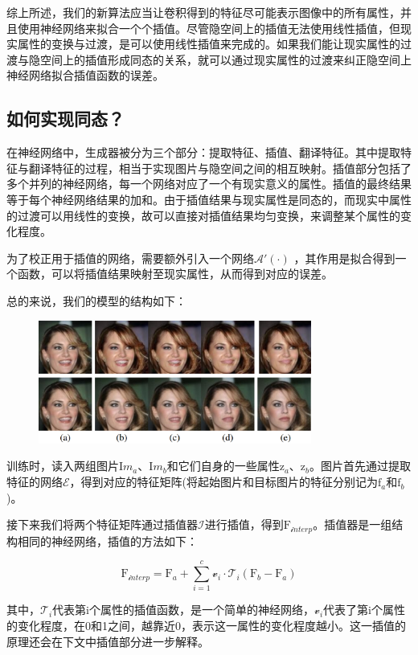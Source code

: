 \documentclass[UTF8,a4paper，12pt]{article}
\def\MC {\mathcal}
\theoremstyle{theorem}
\theoremstyle{definition}
\begin{document}
综上所述，我们的新算法应当让卷积得到的特征尽可能表示图像中的所有属性，并且使用神经网络来拟合一个个插值。尽管隐空间上的插值无法使用线性插值，但现实属性的变换与过渡，是可以使用线性插值来完成的。如果我们能让现实属性的过渡与隐空间上的插值形成同态的关系，就可以通过现实属性的过渡来纠正隐空间上神经网络拟合插值函数的误差。

\subsection{如何实现同态？}

在神经网络中，生成器被分为三个部分：提取特征、插值、翻译特征。其中提取特征与翻译特征的过程，相当于实现图片与隐空间之间的相互映射。插值部分包括了多个并列的神经网络，每一个网络对应了一个有现实意义的属性。插值的最终结果等于每个神经网络结果的加和。由于插值结果与现实属性是同态的，而现实中属性的过渡可以用线性的变换，故可以直接对插值结果均匀变换，来调整某个属性的变化程度。

为了校正用于插值的网络，需要额外引入一个网络$\MC A'(\cdot)$ ，其作用是拟合得到一个函数，可以将插值结果映射至现实属性，从而得到对应的误差。

总的来说，我们的模型的结构如下：

\begin{figure}[htbp]
	\centering
	\includegraphics[width=0.8\textwidth]{assets/11}
	\caption{}
\end{figure}
训练时，读入两组图片$\mathrm Im_a$、$\mathrm Im_b$和它们自身的一些属性$\mathrm z_a$、$\mathrm z_b$。图片首先通过提取特征的网络$\MC E$，得到对应的特征矩阵(将起始图片和目标图片的特征分别记为$\mathrm f_a$和$\mathrm f_b$)。

接下来我们将两个特征矩阵通过插值器$\MC I$进行插值，得到$\mathrm F_{\MC interp}$。插值器是一组结构相同的神经网络，插值的方法如下：

$$\mathrm F_{\MC interp} = \mathrm F_a + \sum_{i=1}^{c}{\MC v_i \cdot \MC T_i(\mathrm F_b - \mathrm F_a)}$$

其中，$\MC T_i$代表第$\mathrm i$个属性的插值函数，是一个简单的神经网络，$\MC v_i$代表了第$\mathrm i$个属性的变化程度，在0和1之间，越靠近0，表示这一属性的变化程度越小。这一插值的原理还会在下文中插值部分进一步解释。
\end{document}
